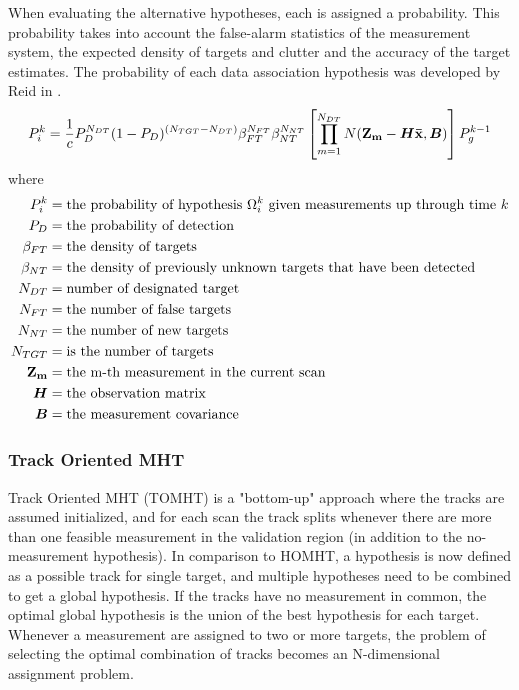 When evaluating the alternative hypotheses, each is assigned a probability. This probability takes into account the false-alarm statistics of the measurement system, the expected density of targets and clutter and the accuracy of the target estimates. The probability of each data association hypothesis was developed by Reid in \cite{Reid1978}.
\begin{equation}
P_i^k = \frac{1}{c} P_D^{N_{DT}}(1-P_D)^{(N_{TGT}-N_{DT})} \beta_{FT}^{N_{FT}} \beta_{NT}^{N_{NT}} \left[ \prod_{m=1}^{N_{DT}} N(\boldsymbol{\mathbf{Z_m}}-\bm{H}\boldsymbol{\mathbf{\bar{x}}},\bm{B}) \right] P_g^{k-1}
\end{equation}
where 
\begin{equation*}
\begin{split}
	P_i^k		&= \text{the probability of hypothesis $\Omega_i^k$ given measurements up through time $k$} \\
	P_D 		&= \text{the probability of detection} \\
	\beta_{FT} 	&= \text{the density of targets} \\
	\beta_{NT}	&= \text{the density of previously unknown targets that have been detected} \\
	N_{DT} 		&=	\text{number of designated target} \\
	N_{FT} 		&= \text{the number of false targets} \\
	N_{NT} 		&= \text{the number of new targets} \\
	N_{TGT} 	&= \text{is the number of targets} \\
	\boldsymbol{\mathbf{Z_m}} 	&= \text{the m-th measurement in the current scan} \\
	\bm{H} 		&= \text{the observation matrix} \\
	\bm{B} 		&= \text{the measurement covariance}
\end{split}
\end{equation*}

\subsubsection{Track Oriented MHT}
Track Oriented MHT (TOMHT) is a "bottom-up" approach where the tracks are assumed initialized, and for each scan the track splits whenever there are more than one feasible measurement in the validation region (in addition to the no-measurement hypothesis). In comparison to HOMHT, a hypothesis is now defined as a possible track for single target, and multiple hypotheses need to be combined to get a global hypothesis. If the tracks have no measurement in common, the optimal global hypothesis is the union of the best hypothesis for each target. Whenever a measurement are assigned to two or more targets, the problem of selecting the optimal combination of tracks becomes an N-dimensional assignment problem.

